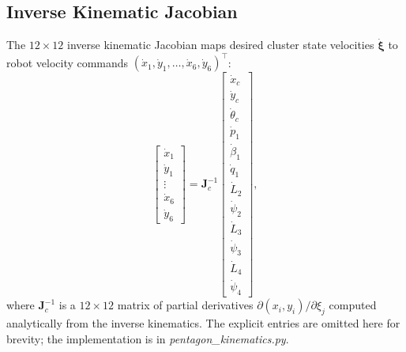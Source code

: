 \documentclass[lettersize,journal]{IEEEtran}
\begin{document}
\subsection{Inverse Kinematic Jacobian}

The $12 \times 12$ inverse kinematic Jacobian maps desired cluster state
velocities $\dot{\boldsymbol{\xi}}$ to robot velocity commands
$(\dot{x}_1, \dot{y}_1, \ldots, \dot{x}_6, \dot{y}_6)^\top$:
\begin{equation}
    \begin{bmatrix} \dot{x}_1 \\ \dot{y}_1 \\ \vdots \\
    \dot{x}_6 \\ \dot{y}_6 \end{bmatrix}
    =
    \mathbf{J}_c^{-1}
    \begin{bmatrix} \dot{x}_c \\ \dot{y}_c \\ \dot{\theta}_c \\
    \dot{p}_1 \\ \dot{\beta}_1 \\ \dot{q}_1 \\
    \dot{L}_2 \\ \dot{\psi}_2 \\ \dot{L}_3 \\ \dot{\psi}_3 \\
    \dot{L}_4 \\ \dot{\psi}_4 \end{bmatrix},
    \label{eq:inv_kin_jac}
\end{equation}
where $\mathbf{J}_c^{-1}$ is a $12 \times 12$ matrix of partial derivatives
$\partial (x_i, y_i) / \partial \xi_j$ computed analytically from the inverse
kinematics. The explicit entries are omitted here for brevity; the
implementation is in \textit{pentagon\_kinematics.py}.
\end{document}
